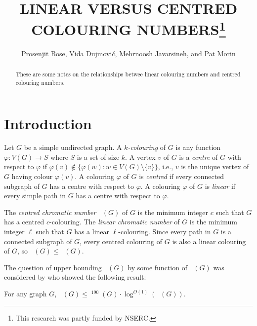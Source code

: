 \documentclass{patmorin}
\title{\MakeUppercase{Linear versus centred Colouring Numbers}\thanks{This research was partly funded by NSERC.}}
\author{Prosenjit Bose, Vida Dujmović, Mehrnoosh Javarsineh, and Pat Morin}
\date{}
\DeclareMathOperator{\chicen}{\chi_{\mathrm{cen}}}
\DeclareMathOperator{\chilin}{\chi_{\mathrm{lin}}}
\begin{document}
\maketitle

\begin{abstract}
    These are some notes on the relationships betwee linear colouring numbers and centred colouring numbers.
\end{abstract}

%



\section{Introduction}

Let $G$ be a simple undirected graph.  A \emph{$k$-colouring} of $G$ is any function $\varphi:V(G)\to S$ where $S$ is a set of size $k$.  A vertex $v$ of $G$ is a \emph{centre} of $G$ with respect to $\varphi$ if $\varphi(v)\not\in\{\varphi(w):w\in V(G)\setminus\{v\}\}$, i.e., $v$ is the unique vertex of $G$ having colour $\varphi(v)$.  A colouring $\varphi$ of $G$ is \emph{centred} if every connected subgraph of $G$ has a centre with respect to $\varphi$. A colouring $\varphi$ of $G$ is \emph{linear} if every simple path in $G$ has a centre with respect to $\varphi$.

The \emph{centred chromatic number} $\chicen(G)$ of $G$ is the minimum integer $c$ such that $G$ has a centred $c$-colouring.  The \emph{linear chromatic number} of $G$ is the minimum integer $\ell$ such that $G$ has a linear $\ell$-colouring.  Since every path in $G$ is a connected subgraph of $G$, every centred colouring of $G$ is also a linear colouring of $G$, so $\chilin(G)\le\chicen(G)$.

The question of upper bounding $\chicen(G)$ by some function of $\chilin(G)$ was considered by \citet[Theorem~1]{kun.obrien.ea:polynomial} who showed the following result:

\begin{thm}\label{kun-obrien-general}
  For any graph $G$, $\chicen(G)\le \chilin^{190}(G)\cdot\log^{O(1)}(\chilin(G))$.
\end{thm}
\end{document}
